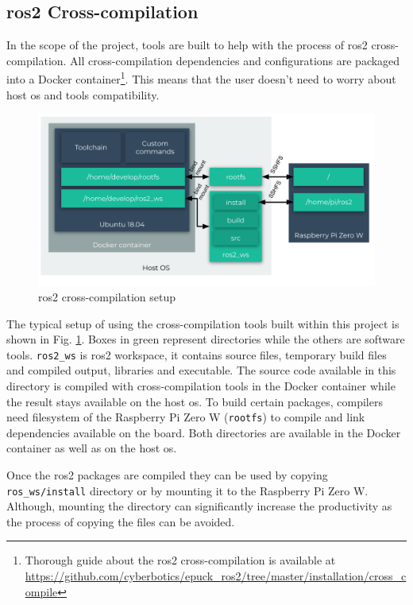 \subsection{\ac{ros2} Cross-compilation}
In the scope of the project, tools are built to help with the process of \ac{ros2} cross-compilation.
All cross-compilation dependencies and configurations are packaged into a Docker container\footnote{Thorough guide about the \ac{ros2} cross-compilation is available at \url{https://github.com/cyberbotics/epuck_ros2/tree/master/installation/cross_compile}}.
This means that the user doesn't need to worry about host \ac{os} and tools compatibility. 

\begin{figure}[H]
    \centering
    \includegraphics[width=\textwidth]{physical/figures/cross_compilation.pdf}
    \caption{\ac{ros2} cross-compilation setup}
    \label{fig:physical:cross_compilation}
\end{figure}

The typical setup of using the cross-compilation tools built within this project is shown in Fig. \ref{fig:physical:cross_compilation}.
Boxes in green represent directories while the others are software tools.
\texttt{ros2\_ws} is \ac{ros2} workspace, it contains source files, temporary build files and compiled output, libraries and executable.
The source code available in this directory is compiled with cross-compilation tools in the Docker container while the result stays available on the host \ac{os}.
To build certain packages, compilers need filesystem of the Raspberry Pi Zero W (\texttt{rootfs}) to compile and link dependencies available on the board.
Both directories are available in the Docker container as well as on the host \ac{os}.

Once the \ac{ros2} packages are compiled they can be used by copying \texttt{ros\_ws/install} directory or by mounting it to the Raspberry Pi Zero W.
Although, mounting the directory can significantly increase the productivity as the process of copying the files can be avoided.


